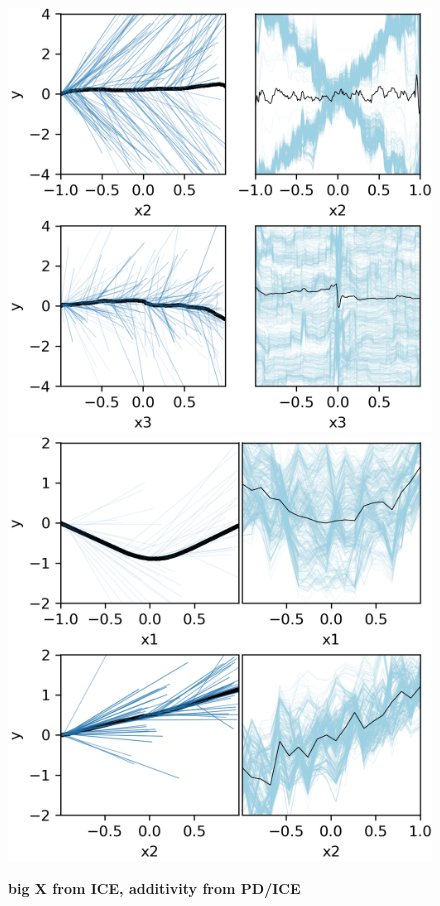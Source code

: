 \documentclass[12pt]{article}
\begin{document}
\begin{figure}[htbp]
\begin{center}
\includegraphics[scale=0.7]{images/bigx.png}
\includegraphics[scale=0.7]{images/additivity.png}
\caption{{\bf big X from ICE, additivity from PD/ICE}}
\label{fig:bigx_y_stratpd}
\end{center}
\end{figure}
\end{document}
